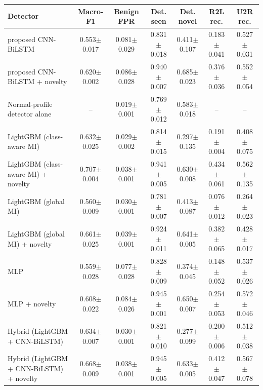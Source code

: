 \begin{tabular}{lcccccc}
\toprule
Detector & Macro-F1 & Benign FPR & Det. seen & Det. novel & R2L rec. & U2R rec. \\
\midrule
proposed CNN-BiLSTM & 0.553$\pm$0.017 & 0.081$\pm$0.029 & 0.831$\pm$0.018 & 0.411$\pm$0.107 & 0.183$\pm$0.041 & 0.527$\pm$0.031 \\
proposed CNN-BiLSTM + novelty & 0.620$\pm$0.002 & 0.086$\pm$0.028 & 0.940$\pm$0.007 & 0.685$\pm$0.023 & 0.376$\pm$0.036 & 0.552$\pm$0.054 \\
Normal-profile detector alone & -- & 0.019$\pm$0.001 & 0.769$\pm$0.012 & 0.583$\pm$0.018 & -- & -- \\
LightGBM (class-aware MI) & 0.632$\pm$0.025 & 0.029$\pm$0.002 & 0.814$\pm$0.015 & 0.297$\pm$0.135 & 0.191$\pm$0.004 & 0.408$\pm$0.075 \\
LightGBM (class-aware MI) + novelty & 0.707$\pm$0.004 & 0.038$\pm$0.001 & 0.941$\pm$0.005 & 0.630$\pm$0.008 & 0.434$\pm$0.061 & 0.562$\pm$0.135 \\
LightGBM (global MI) & 0.560$\pm$0.009 & 0.030$\pm$0.001 & 0.781$\pm$0.007 & 0.413$\pm$0.087 & 0.076$\pm$0.012 & 0.264$\pm$0.023 \\
LightGBM (global MI) + novelty & 0.661$\pm$0.025 & 0.039$\pm$0.001 & 0.924$\pm$0.011 & 0.641$\pm$0.005 & 0.382$\pm$0.065 & 0.428$\pm$0.017 \\
MLP & 0.559$\pm$0.028 & 0.077$\pm$0.028 & 0.828$\pm$0.009 & 0.374$\pm$0.045 & 0.148$\pm$0.052 & 0.537$\pm$0.026 \\
MLP + novelty & 0.608$\pm$0.022 & 0.084$\pm$0.026 & 0.945$\pm$0.001 & 0.650$\pm$0.007 & 0.254$\pm$0.053 & 0.572$\pm$0.046 \\
Hybrid (LightGBM + CNN-BiLSTM) & 0.634$\pm$0.007 & 0.030$\pm$0.001 & 0.821$\pm$0.010 & 0.277$\pm$0.099 & 0.200$\pm$0.006 & 0.512$\pm$0.038 \\
Hybrid (LightGBM + CNN-BiLSTM) + novelty & 0.668$\pm$0.009 & 0.038$\pm$0.001 & 0.945$\pm$0.005 & 0.633$\pm$0.005 & 0.412$\pm$0.047 & 0.567$\pm$0.078 \\
\bottomrule
\end{tabular}

